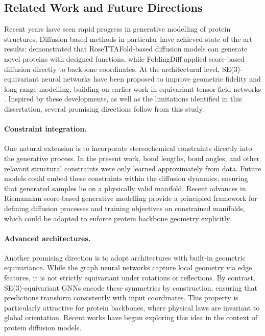 \documentclass[a4paper,12pt]{article}
\begin{document}
\subsection{Related Work and Future Directions}\label{subsec:future-work}
Recent years have seen rapid progress in generative modelling of protein structures. Diffusion-based methods in particular have achieved state-of-the-art results: \citet{watsonNovoDesignProtein2023} demonstrated that RoseTTAFold-based diffusion models can generate novel proteins with designed functions, while FoldingDiff \citep{wuProteinStructureGeneration2024} applied score-based diffusion directly to backbone coordinates. At the architectural level, SE(3)-equivariant neural networks \citep{satorras2021EquivariantGraphNeural,geiger2022E3nnEuclideanNeural} have been proposed to improve geometric fidelity and long-range modelling, building on earlier work in equivariant tensor field networks \citep{thomasTensorFieldNetworks2018,weiler3DSteerableCNNs2018,kondorClebschGordanNetsFully2018}. Inspired by these developments, as well as the limitations identified in this dissertation, several promising directions follow from this study.

\paragraph{Constraint integration.}
One natural extension is to incorporate stereochemical constraints directly into the generative process. In the present work, bond lengths, bond angles, and other relavant structural constraints were only learned approximately from data. Future models could embed these constraints within the diffusion dynamics, ensuring that generated samples lie on a physically valid manifold. Recent advances in Riemannian score-based generative modelling \citep{debortoliRiemannianScoreBasedGenerative2022,huang2022RiemannianDiffusionModels,chungImprovingDiffusionModels2022} provide a principled framework for defining diffusion processes and training objectives on constrained manifolds, which could be adapted to enforce protein backbone geometry explicitly. 

\paragraph{Advanced architectures.}
Another promising direction is to adopt architectures with built-in geometric equivariance. While the graph neural networks capture local geometry via edge features, it is not strictly equivariant under rotations or reflections. By contrast, SE(3)-equivariant GNNs \citep{thomasTensorFieldNetworks2018,weiler3DSteerableCNNs2018,kondorClebschGordanNetsFully2018,geiger2022E3nnEuclideanNeural,geiger2025EuclideanNeuralNetworks} encode these symmetries by construction, ensuring that predictions transform consistently with input coordinates. This property is particularly attractive for protein backbones, where physical laws are invariant to global orientation. Recent works \citep{yimDiffusionModelsProtein2024} have begun exploring this idea in the context of protein diffusion models.
\end{document}
